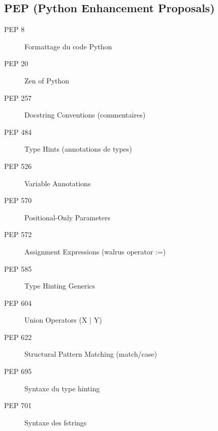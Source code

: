 \documentclass{article}
\begin{document}
\begin{multicols*}{4}
\subsection*{PEP (Python Enhancement Proposals)}
\begin{description}
    \item[PEP 8] Formattage du code Python
    \item[PEP 20] Zen of Python
    \item[PEP 257] Docstring Conventions (commentaires)
    \item[PEP 484] Type Hints (annotations de types)
    \item[PEP 526] Variable Annotations
    \item[PEP 570] Positional-Only Parameters
    \item[PEP 572] Assignment Expressions (walrus operator :=)
    \item[PEP 585] Type Hinting Generics
    \item[PEP 604] Union Operators (X | Y)
    \item[PEP 622] Structural Pattern Matching (match/case)
    \item[PEP 695] Syntaxe du type hinting
    \item[PEP 701] Syntaxe des fstrings
\end{description}

\end{multicols*}
\end{document}
